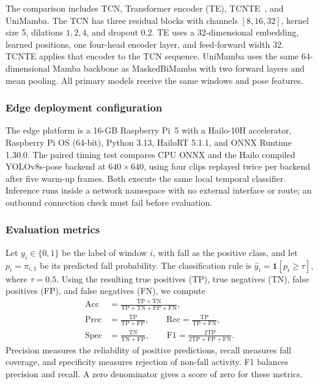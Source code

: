 The comparison includes TCN, Transformer encoder (TE), TCNTE~\cite{yu2025tcnte}, and UniMamba. The TCN has three residual blocks with channels $[8,16,32]$, kernel size 5, dilations $1,2,4$, and dropout 0.2. TE uses a 32-dimensional embedding, learned positions, one four-head encoder layer, and feed-forward width 32. TCNTE applies that encoder to the TCN sequence. UniMamba uses the same 64-dimensional Mamba backbone as MaskedBiMamba with two forward layers and mean pooling. All primary models receive the same windows and pose features.

\subsubsection{Edge deployment configuration}
The edge platform is a 16-GB Raspberry Pi~5 with a Hailo-10H accelerator, Raspberry Pi OS (64-bit), Python 3.13, HailoRT 5.1.1, and ONNX Runtime 1.30.0. The paired timing test compares CPU ONNX and the Hailo compiled YOLOv8s-pose backend at $640\times640$, using four clips replayed twice per backend after five warm-up frames. Both execute the same local temporal classifier. Inference runs inside a network namespace with no external interface or route; an outbound connection check must fail before evaluation.

\subsubsection{Evaluation metrics}

Let $y_i\in\{0,1\}$ be the label of window $i$, with fall as the positive class, and let $p_i=\pi_{i,1}$ be its predicted fall probability. The classification rule is $\hat y_i=\mathbf{1}[p_i\geq\tau]$, where $\tau=0.5$. Using the resulting true positives (TP), true negatives (TN), false positives (FP), and false negatives (FN), we compute
\begin{equation}
\begin{aligned}
\mathrm{Acc} &= \frac{\mathrm{TP}+\mathrm{TN}}{\mathrm{TP}+\mathrm{TN}+\mathrm{FP}+\mathrm{FN}},\\
\mathrm{Prec} &= \frac{\mathrm{TP}}{\mathrm{TP}+\mathrm{FP}},\qquad
\mathrm{Rec}=\frac{\mathrm{TP}}{\mathrm{TP}+\mathrm{FN}},\\
\mathrm{Spec} &= \frac{\mathrm{TN}}{\mathrm{TN}+\mathrm{FP}},\qquad
\mathrm{F1}=\frac{2\mathrm{TP}}{2\mathrm{TP}+\mathrm{FP}+\mathrm{FN}}.
\end{aligned}
\label{eq:metric_confusion}
\end{equation}
Precision measures the reliability of positive predictions, recall measures fall coverage, and specificity measures rejection of non-fall activity. F1 balances precision and recall. A zero denominator gives a score of zero for these metrics.

